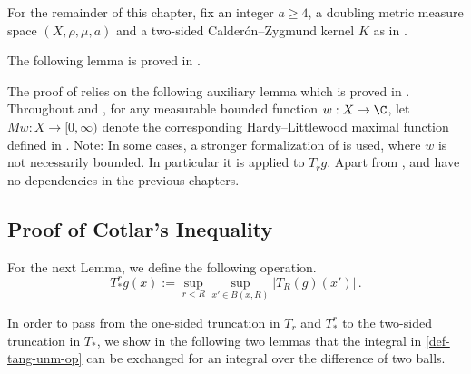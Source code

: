 For the remainder of this chapter, fix an integer $a\ge 4$, a doubling metric measure space $(X,\rho,\mu,a)$ and a two-sided Calder\'on--Zygmund kernel $K$ as in .

The following lemma is proved in .



The proof of  relies on the following auxiliary lemma which is proved in .
Throughout  and , for any measurable bounded function $w: X \to \C$, let $Mw: X \to [0, \infty)$ denote the corresponding Hardy--Littlewood maximal function defined in .
Note: In some cases, a stronger formalization of  is used, where $w$ is not necessarily bounded. In particular it is applied to $T_rg$.
Apart from ,  and  have no dependencies in the previous chapters.



\subsection{Proof of Cotlar's Inequality}
\label{subsec-cotlar}















For the next Lemma, we define the following operation.
\begin{equation}\label{eq-simple--nontangential}
    T_{*}^r g(x):=\sup_{r<R}\sup_{x'\in B(x,R)} |T_R(g)(x')| \, .
\end{equation}


In order to pass from the one-sided truncation in $T_r$ and $T_{*}^r$ to the two-sided truncation in $T_*$, we show in the following two lemmas that the integral in \eqref{def-tang-unm-op} can be exchanged for an integral over the difference of two balls.


